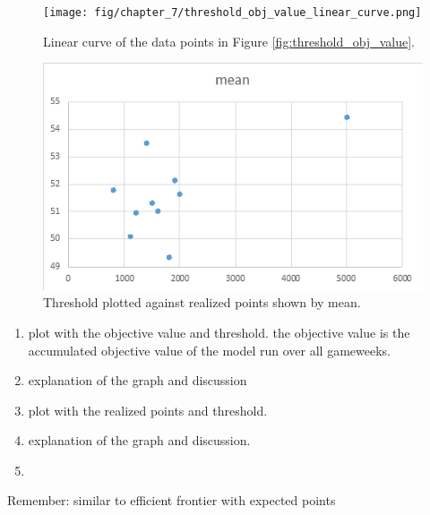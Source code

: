 \begin{figure}[H]
    \centering
    \texttt{[image: fig/chapter\_7/threshold\_obj\_value\_linear\_curve.png]}
    \caption{Linear curve of the data points in Figure \ref{fig:threshold_obj_value}.}
\label{fig:threshold_obj_value_linear_curve}    
\end{figure}


\begin{figure}[H]
    \centering
    \includegraphics[scale=0.75]{fig/chapter_7/threshold_mean.png}
    \caption{Threshold plotted against realized points shown by mean.}
\label{fig:threshold_mean}    
\end{figure}

\begin{enumerate}
    \item plot with the objective value and threshold. the objective value is the accumulated objective value of the model run over all gameweeks. 
    \item explanation of the graph and discussion 
    \item plot with the realized points and threshold. 
    \item explanation of the graph and discussion. 
    \item 
\end{enumerate}
Remember: similar to efficient frontier with expected points

